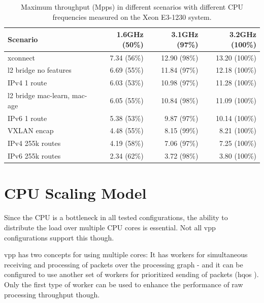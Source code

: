 
\begin{table}[!ht]
	\vspace{5ex}
	\begin{tabular}[]{ l r r r }
		Scenario & 1.6GHz (50\%) & 3.1GHz (97\%)  & 3.2GHz (100\%) \\ 
		\midrule
		xconnect & 7.34 (56\%) & 12.90 (98\%) & 13.20 (100\%) \\ %
		l2 bridge no features & 6.69 (55\%) & 11.84 (97\%) & 12.18 (100\%) \\ %
		IPv4 1 route & 6.03 (53\%) & 10.98 (97\%) & 11.28 (100\%) \\ %
		l2 bridge mac-learn, mac-age & 6.05 (55\%) & 10.84 (98\%) & 11.09 (100\%) \\ %
		IPv6 1 route & 5.38 (53\%) & 9.87 (97\%) & 10.14 (100\%) \\ %
		VXLAN encap & 4.48 (55\%) & 8.15 (99\%) & 8.21 (100\%) \\ %
		IPv4 255k routes & 4.19 (58\%) & 7.06 (97\%) & 7.25 (100\%) \\ %
		IPv6 255k routes & 2.34 (62\%) & 3.72 (98\%) & 3.80 (100\%) \\ %
		\midrule
	\end{tabular}
	\caption{Maximum throughput (Mpps) in different scenarios with different CPU frequencies measured on the Xeon E3-1230 system. }
	\label{bottleneck}
\end{table}


\section{CPU Scaling Model}

Since the CPU is a bottleneck in all tested configurations, the
ability to distribute the load over multiple CPU cores is
essential. Not all \Ac{vpp} configurations support this though.

\Ac{vpp} has two concepts for using multiple cores: It has workers for
simultaneous receiving and processing of packets over the processing
graph - and it can be configured to use another set of workers for
prioritized sending of packets (\Ac{hqos} \cite{vppdocs:qos}
\cite{vppdocs:hqosplacement}). Only the first type of worker can be
used to enhance the performance of raw processing throughput though.

